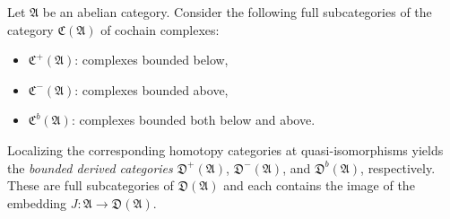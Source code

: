 Let $\mathfrak{A}$ be an abelian category. Consider the following full subcategories of the category $\mathfrak{C}(\mathfrak{A})$ of cochain complexes:
\begin{itemize}
\item $\mathfrak{C}^+(\mathfrak{A})$: complexes bounded below,
\item $\mathfrak{C}^-(\mathfrak{A})$: complexes bounded above,
\item $\mathfrak{C}^b(\mathfrak{A})$: complexes bounded both below and above.
\end{itemize}
Localizing the corresponding homotopy categories at quasi-isomorphisms yields the {\it bounded derived categories} $\mathfrak{D}^+(\mathfrak{A})$, $\mathfrak{D}^-(\mathfrak{A})$, and $\mathfrak{D}^b(\mathfrak{A})$, respectively. These are full subcategories of $\mathfrak{D}(\mathfrak{A})$ and each contains the image of the embedding $J : \mathfrak{A} \to \mathfrak{D}(\mathfrak{A})$.
